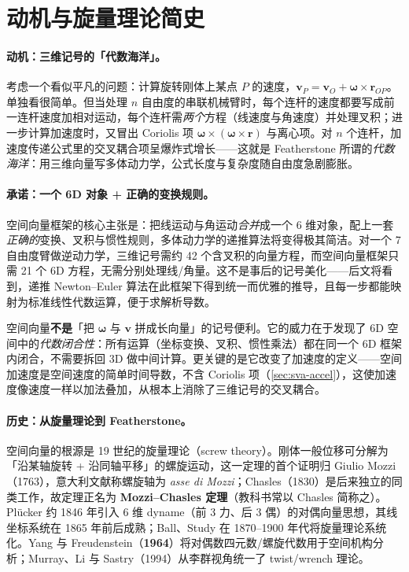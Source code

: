 \section{动机与旋量理论简史}
\label{sec:sva-motivation}

\paragraph{动机：三维记号的「代数海洋」。}
考虑一个看似平凡的问题：计算旋转刚体上某点 $P$ 的速度，$\mathbf v_P=\mathbf v_O+\boldsymbol\omega\times\mathbf r_{OP}$。单独看很简单。但当处理 $n$ 自由度的串联机械臂时，每个连杆的速度都要写成前一连杆速度加相对运动，每个连杆需\emph{两个}方程（线速度与角速度）并处理叉积；进一步计算加速度时，又冒出 Coriolis 项 $\boldsymbol\omega\times(\boldsymbol\omega\times\mathbf r)$ 与离心项。对 $n$ 个连杆，加速度传递公式里的交叉耦合项呈爆炸式增长——这就是 Featherstone 所谓的\emph{代数海洋}：用三维向量写多体动力学，公式长度与复杂度随自由度急剧膨胀。

\paragraph{承诺：一个 6D 对象 + 正确的变换规则。}
空间向量框架的核心主张是：把线运动与角运动\emph{合并}成一个 6 维对象，配上一套\emph{正确的}变换、叉积与惯性规则，多体动力学的递推算法将变得极其简洁。对一个 7 自由度臂做逆动力学，三维记号需约 42 个含叉积的向量方程，而空间向量框架只需 21 个 6D 方程，无需分别处理线/角量。这不是事后的记号美化——后文将看到，递推 Newton--Euler 算法在此框架下得到统一而优雅的推导，且每一步都能映射为标准线性代数运算，便于求解析导数。

\begin{insight}
空间向量\textbf{不是}「把 $\boldsymbol\omega$ 与 $\mathbf v$ 拼成长向量」的记号便利。它的威力在于发现了 6D 空间中的\emph{代数闭合性}：所有运算（坐标变换、叉积、惯性乘法）都在同一个 6D 框架内闭合，不需要拆回 3D 做中间计算。更关键的是它改变了加速度的定义——空间加速度是空间速度的简单时间导数，不含 Coriolis 项（\cref{sec:sva-accel}），这使加速度像速度一样以加法叠加，从根本上消除了三维记号的交叉耦合。
\end{insight}

\paragraph{历史：从旋量理论到 Featherstone。}
空间向量的根源是 19 世纪的旋量理论（screw theory）。刚体一般位移可分解为「沿某轴旋转 + 沿同轴平移」的螺旋运动，这一定理的首个证明归 Giulio Mozzi（1763），意大利文献称螺旋轴为 \emph{asse di Mozzi}；Chasles（1830）是后来独立的同类工作，故定理正名为 \textbf{Mozzi--Chasles 定理}\cite{ceccarelli2000screw}（教科书常以 Chasles 简称之）。Plücker 约 1846 年引入 6 维 dyname（前 3 力、后 3 偶）的对偶向量思想，其线坐标系统在 1865 年前后成熟；Ball、Study 在 1870--1900 年代将旋量理论系统化。Yang 与 Freudenstein（\textbf{1964}）将对偶数四元数/螺旋代数用于空间机构分析\cite{yang1964application}；Murray、Li 与 Sastry（1994）从李群视角统一了 twist/wrench 理论\cite{murray1994mathematical}。

